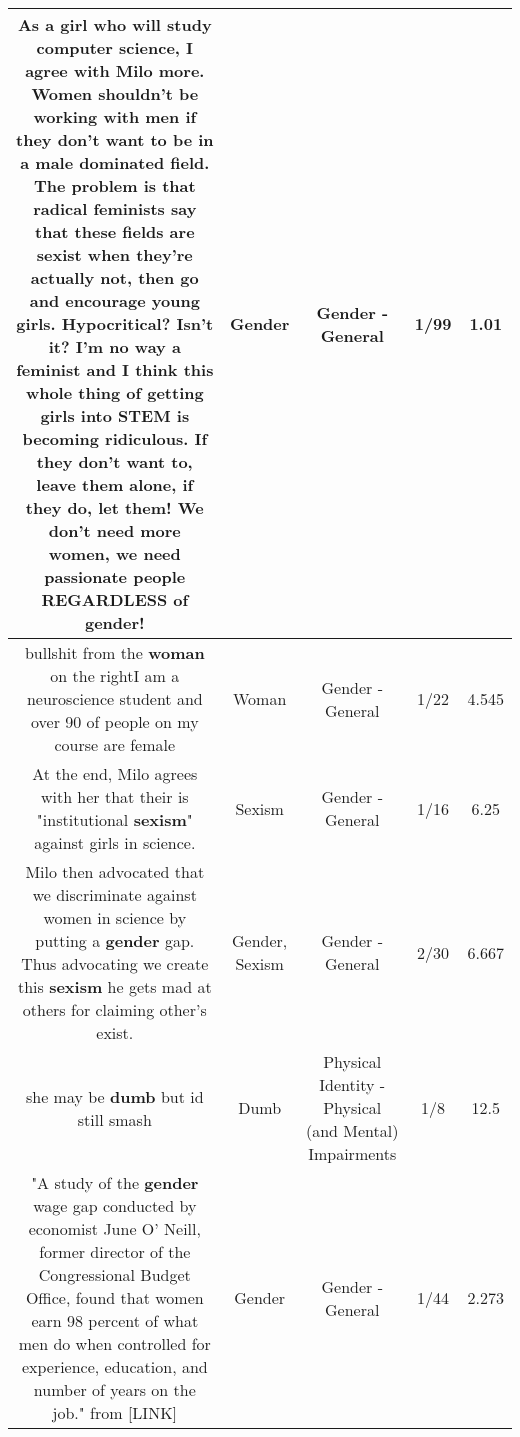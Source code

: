 \documentclass[11pt]{article}
\newlength\mylength
\begin{document}
\begin{center}
\begin{longtable}{|C{.65\mylength}|C{.30\mylength}|C{.12\mylength}|C{.12\mylength}|C{.12\mylength}|}
  \small As a girl who will study computer science, I agree with Milo more. Women shouldn't be working with men if they don't want to be in a male dominated field. The problem is that radical feminists say that these fields are sexist when they're actually not, then go and encourage young girls. Hypocritical? Isn't it? I'm no way a feminist and I think this whole thing of getting girls into STEM is becoming ridiculous. If they don't want to, leave them alone, if they do, let them! We don't need more women, we need passionate people REGARDLESS of \textbf{gender}!\normalsize   & Gender & Gender - General & 1/99 & 1.01 \\  \hline
  \small bullshit from the \textbf{woman} on the rightI am a neuroscience student and over 90 of people on my course are female\normalsize   & Woman & Gender - General & 1/22 & 4.545 \\  \hline
  \small At the end, Milo agrees with her that their is "institutional \textbf{sexism}" against girls in science.\normalsize   & Sexism & Gender - General & 1/16 & 6.25 \\  \hline
  \small Milo then advocated that we discriminate against women in science by putting a \textbf{gender} gap. Thus advocating we create this \textbf{sexism} he gets mad at others for claiming other's exist.\normalsize   & Gender, Sexism & Gender - General & 2/30 & 6.667 \\  \hline
  \small she may be \textbf{dumb} but id still smash\normalsize   & Dumb & Physical Identity - Physical (and Mental) Impairments & 1/8 & 12.5 \\  \hline
  \small "A study of the \textbf{gender} wage gap conducted by economist June O' Neill, former director of the Congressional Budget Office, found that women earn 98 percent of what men do when controlled for experience, education, and number of years on the job."  from  [LINK] \normalsize   & Gender & Gender - General & 1/44 & 2.273 \\  \hline

\end{longtable}
\end{center}
\end{document}

